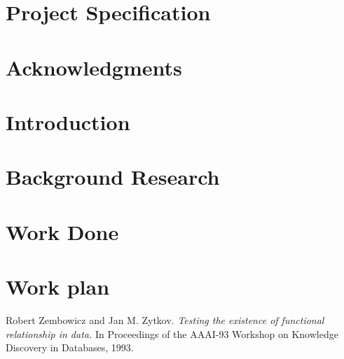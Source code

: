 \documentclass[]{UCD_CS_FYP_Report}
\begin{document}
\maketitle


\chapter*{Project Specification}



\begin{abstract}
		
\end{abstract}
\newpage


\chapter*{Acknowledgments}



\tableofcontents{}\newpage
\newpage


\chapter{Introduction}



\chapter{Background Research}



\chapter{Work Done}



\chapter{Work plan}


\newpage
\begin{thebibliography}{99}
	Robert Zembowicz and Jan M. Zytkov. \emph{Testing the existence of functional relationship in data.} In Proceedings of the AAAI-93 Workshop on Knowledge Discovery in Databases, 1993.
\end{thebibliography}\label{endpage}
\end{document}
